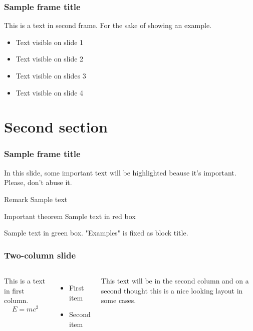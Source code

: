 \documentclass{beamer}
\begin{document}
\begin{frame}
\frametitle{Sample frame title}
This is a text in second frame. For the sake of showing an example.

\begin{itemize}
\item<1-> Text visible on slide 1
\item<2-> Text visible on slide 2
\item<3> Text visible on slides 3
\item<4-> Text visible on slide 4
\end{itemize}
\end{frame}


\section{Second section}

\begin{frame}
\frametitle{Sample frame title}

In this slide, some important text will be
\alert{highlighted} beause it's important.
Please, don't abuse it.

\begin{block}{Remark}
Sample text
\end{block}

\begin{alertblock}{Important theorem}
Sample text in red box
\end{alertblock}

\begin{examples}
Sample text in green box. "Examples" is fixed as block title.
\end{examples}
\end{frame}


\begin{frame}
\frametitle{Two-column slide}

\begin{columns}

This is a text in first column.
$$E=mc^2$$
\begin{itemize}
\item First item
\item Second item
\end{itemize}

This text will be in the second column
and on a second thought this is a nice looking
layout in some cases.
\end{columns}
\end{frame}
\end{document}
